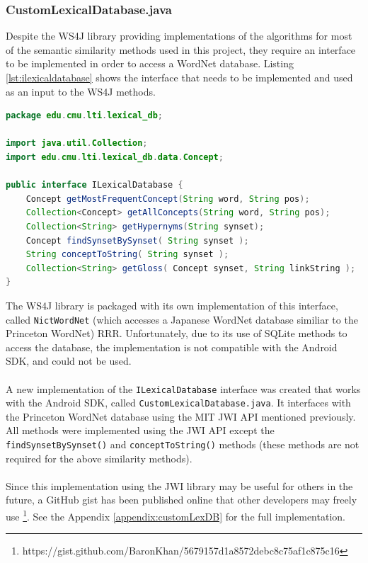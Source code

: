\documentclass[11pt]{article}
\begin{document}
\subsubsection{CustomLexicalDatabase.java}

Despite the WS4J library providing implementations of the algorithms for most of the semantic similarity methods used in this project, they require an interface to be implemented in order to access a WordNet database. Listing \ref{lst:ilexicaldatabase} shows the interface that needs to be implemented and used as an input to the WS4J methods.

\begin{lstlisting}[language=Java, caption=ILexicalDatabase.java (from the WS4J library), label={lst:ilexicaldatabase}]
package edu.cmu.lti.lexical_db;

import java.util.Collection;
import edu.cmu.lti.lexical_db.data.Concept;

public interface ILexicalDatabase {
	Concept getMostFrequentConcept(String word, String pos);
	Collection<Concept> getAllConcepts(String word, String pos);
	Collection<String> getHypernyms(String synset);
	Concept findSynsetBySynset( String synset );
	String conceptToString( String synset );
	Collection<String> getGloss( Concept synset, String linkString );
}
\end{lstlisting}

The WS4J library is packaged with its own implementation of this interface, called \texttt{NictWordNet} (which accesses a Japanese WordNet database similiar to the Princeton WordNet) RRR. Unfortunately, due to its use of SQLite methods to access the database, the implementation is not compatible with the Android SDK, and could not be used.
\\
\\
A new implementation of the \texttt{ILexicalDatabase} interface was created that works with the Android SDK, called \texttt{CustomLexicalDatabase.java}. It interfaces with the Princeton WordNet database using the MIT JWI API mentioned previously. All methods were implemented using the JWI API except the \texttt{findSynsetBySynset()} and \texttt{conceptToString()} methods (these methods are not required for the above similarity methods).
\\
\\
Since this implementation using the JWI library may be useful for others in the future, a GitHub gist has been published online that other developers may freely use \footnote{https://gist.github.com/BaronKhan/5679157d1a8572debc8c75af1c875c16}. See the Appendix \ref{appendix:customLexDB} for the full implementation.
\end{document}

